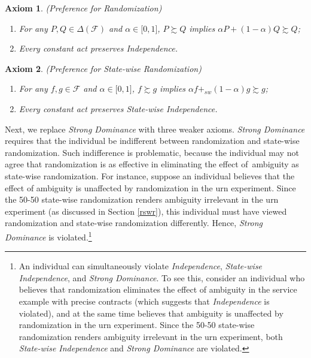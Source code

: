 \documentclass[12pt, notitlepage]{article}
\newtheorem{axiom}{Axiom}
\begin{document}
\begin{axiom}
(Preference for Randomization)

\begin{enumerate}
\item[(i)] For any $P,Q\in \Delta (\mathcal{F})$ and $\alpha \in \lbrack
0,1] $, $P\succsim Q$ implies $\alpha P+(1-\alpha )Q\succsim Q$;

\item[(ii)] Every constant act preserves Independence.
\end{enumerate}
\end{axiom}

\begin{axiom}
(Preference for State-wise Randomization)

\begin{enumerate}
\item[(i)] For any $f,g\in \mathcal{F}$ and $\alpha \in \lbrack 0,1]$, $%
f\succsim g$ implies $\alpha f+_{sw}(1-\alpha )g\succsim g$;

\item[(ii)] Every constant act preserves State-wise Independence.
\end{enumerate}
\end{axiom}

Next, we replace \textit{Strong Dominance} with three weaker axioms. \textit{%
Strong Dominance} requires that the individual be indifferent between
randomization and state-wise randomization. Such indifference is
problematic, because the individual may not agree that randomization is as
effective in eliminating the effect of\ ambiguity as state-wise
randomization. For instance, suppose an individual believes that the effect
of ambiguity is unaffected by randomization in the urn experiment. Since the
50-50 state-wise randomization renders ambiguity irrelevant in the urn
experiment (as discussed in Section \ref{rswr}), this individual must have
viewed randomization and state-wise randomization differently. Hence, 
\textit{Strong Dominance} is violated.\footnote{%
An individual can simultaneously violate \textit{Independence}, \textit{%
State-wise Independence}, and \textit{Strong Dominance}. To see this,
consider an individual who believes that randomization eliminates the effect
of ambiguity in the service example with precise contracts (which suggests
that \textit{Independence} is violated), and at the same time believes that
ambiguity is unaffected by randomization in the urn experiment. Since the
50-50 state-wise randomization renders ambiguity irrelevant in the urn
experiment, both \textit{State-wise Independence} and \textit{Strong
Dominance} are violated.}
\end{document}
